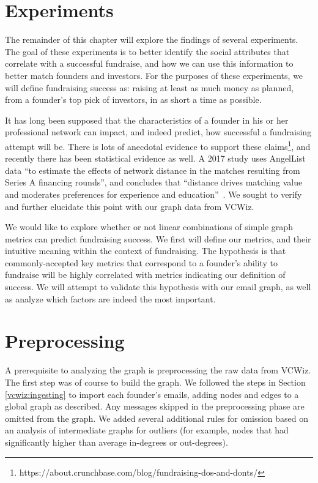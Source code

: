 \section{Experiments}

The remainder of this chapter will explore the findings of several experiments. The goal of these experiments is to better identify the social attributes that correlate with a successful fundraise, and how we can use this information to better match founders and investors. For the purposes of these experiments, we will define fundraising success as: raising at least as much money as planned, from a founder's top pick of investors, in as short a time as possible.

It has long been supposed that the characteristics of a founder in his or her professional network can impact, and indeed predict, how successful a fundraising attempt will be. There is lots of anecdotal evidence to support these claims\footnote{https://about.crunchbase.com/blog/fundraising-dos-and-donts/}, and recently there has been statistical evidence as well. A 2017 study uses AngelList data ``to estimate the effects of network distance in the matches resulting from Series A financing rounds'', and concludes that ``distance drives matching value and moderates preferences for experience and education''~\cite{pasquini2017matching}. We sought to verify and further elucidate this point with our graph data from VCWiz.

We would like to explore whether or not linear combinations of simple graph metrics can predict fundraising success. We first will define our metrics, and their intuitive meaning within the context of fundraising. The hypothesis is that commonly-accepted key metrics that correspond to a founder's ability to fundraise will be highly correlated with metrics indicating our definition of success. We will attempt to validate this hypothesis with our email graph, as well as analyze which factors are indeed the most important.

\section{Preprocessing}
\label{ch5:preprocessing}

A prerequisite to analyzing the graph is preprocessing the raw data from VCWiz. The first step was of course to build the graph. We followed the steps in Section \ref{vcwiz:ingesting} to import each founder's emails, adding nodes and edges to a global graph as described. Any messages skipped in the preprocessing phase are omitted from the graph. We added several additional rules for omission based on an analysis of intermediate graphs for outliers (for example, nodes that had significantly higher than average in-degrees or out-degrees).

